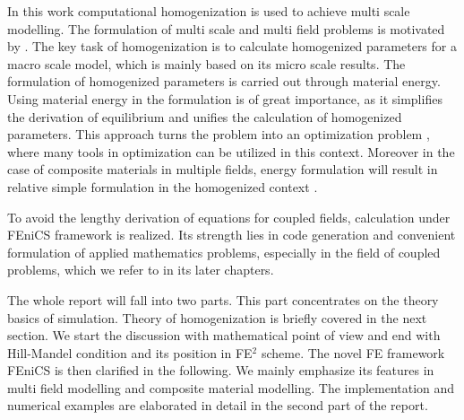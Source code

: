 \documentclass[10pt,a4paper]{scrreprt}
\begin{document}
In this work computational homogenization is used to achieve multi scale modelling. The formulation of multi scale and multi field problems is motivated by \citep{SchKei:2012:tho}. The key task of homogenization is to calculate homogenized parameters for a macro scale model, which is mainly based on its micro scale results. The formulation of homogenized parameters is carried out through material energy. Using material energy in the formulation is of great importance, as it simplifies the derivation of equilibrium and unifies the calculation of homogenized parameters. This approach turns the problem into an optimization problem \citep{miehe_computational_2015}, where many tools in optimization can be utilized in this context. Moreover in the case of composite materials in multiple fields, energy formulation will result in relative simple formulation in the homogenized context \citep{miehe_homogenization_2016}. 

To avoid the lengthy derivation of equations for coupled fields, calculation under FEniCS framework is realized. Its strength lies in code generation and convenient formulation of applied mathematics problems, especially in the field of coupled problems, which we refer to \citep{wells2012automated} in its later chapters. 

The whole report will fall into two parts. This part concentrates on the theory basics of simulation. Theory of homogenization is briefly covered in the next section. We start the discussion with mathematical point of view and end with Hill-Mandel condition and its position in FE$^{2}$ scheme. The novel FE framework FEniCS is then clarified in the following. We mainly emphasize its features in multi field modelling and composite material modelling. The implementation and numerical examples are elaborated in detail in the second part of the report.
\end{document}
